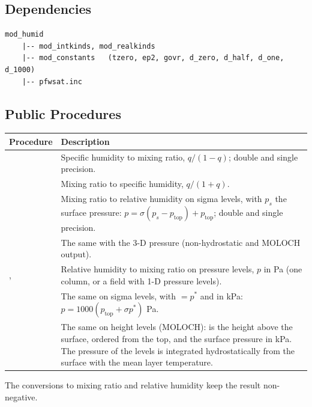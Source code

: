 \subsection{Dependencies}

\begin{lstlisting}
mod_humid
    |-- mod_intkinds, mod_realkinds
    |-- mod_constants   (tzero, ep2, govr, d_zero, d_half, d_one, d_1000)
    |-- pfwsat.inc
\end{lstlisting}

\subsection{Public Procedures}

\begin{longtable}{L{5.5cm} L{8.5cm}}
  \toprule
  \textbf{Procedure} & \textbf{Description} \\
  \midrule
  \endhead
  \bottomrule
  \endfoot
   &
    Specific humidity to mixing ratio, $q/(1-q)$; double and single
    precision. \\
   &
    Mixing ratio to specific humidity, $q/(1+q)$. \\
   &
    Mixing ratio to relative humidity on sigma levels, with $p_s$ the
    surface pressure: $p = \sigma(p_s - p_\text{top}) + p_\text{top}$;
    double and single precision. \\
   &
    The same with the 3-D pressure (non-hydrostatic and MOLOCH output). \\
  ,  &
    Relative humidity to mixing ratio on pressure levels, $p$ in Pa (one
    column, or a field with 1-D pressure levels). \\
   &
    The same on sigma levels, with  $= p^*$ and  in
    kPa: $p = 1000(p_\text{top} + \sigma p^*)$ Pa. \\
   &
    The same on height levels (MOLOCH):  is the height above the
    surface, ordered from the top, and  the surface pressure in
    kPa. The pressure of the levels is integrated hydrostatically from the
    surface with the mean layer temperature. \\
\end{longtable}

The conversions to mixing ratio and relative humidity keep the result
non-negative.

